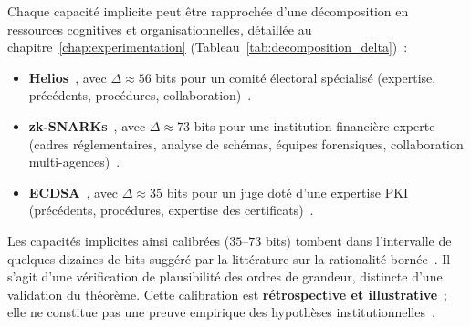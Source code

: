\begin{sloppypar}
Chaque capacit\'e implicite peut \^etre rapproch\'ee d'une d\'ecomposition en
ressources cognitives et organisationnelles, d\'etaill\'ee au
chapitre~\ref{chap:experimentation}
(Tableau~\ref{tab:decomposition_delta})~:

\begin{itemize}
\item \textbf{Helios}~\cite{Adida08,Goodman15}, avec $\Delta \approx 56$ bits pour un comit\'e
\'electoral sp\'ecialis\'e (expertise, pr\'ec\'edents, proc\'edures, collaboration)~\cite{Ericsson95,Simon82}.

\item \textbf{zk-SNARKs}~\cite{Groth16,BCTV14}, avec $\Delta \approx 73$ bits pour une institution
financi\`ere experte (cadres r\'eglementaires, analyse de sch\'emas, \'equipes
forensiques, collaboration multi-agences)~\cite{BaselIII}.

\item \textbf{ECDSA}~\cite{Johnson01,Mason07}, avec $\Delta \approx 35$ bits pour un juge dot\'e
d'une expertise PKI (pr\'ec\'edents, proc\'edures, expertise des certificats)~\cite{Kerr04,Casey11}.
\end{itemize}

Les capacit\'es implicites ainsi calibr\'ees ($35$--$73$ bits) tombent dans
l'intervalle de quelques dizaines de bits sugg\'er\'e par la litt\'erature sur la
rationalit\'e born\'ee~\cite{Miller56,Simon82,Ericsson95,Cowan2001}. Il s'agit
d'une v\'erification de plausibilit\'e des ordres de grandeur, distincte d'une validation du th\'eor\`eme. Cette calibration est \textbf{r\'etrospective et
illustrative}~; elle ne constitue pas une preuve empirique des hypoth\`eses
institutionnelles~\cite{Tsybakov2009,Kahneman11}.
\end{sloppypar}


